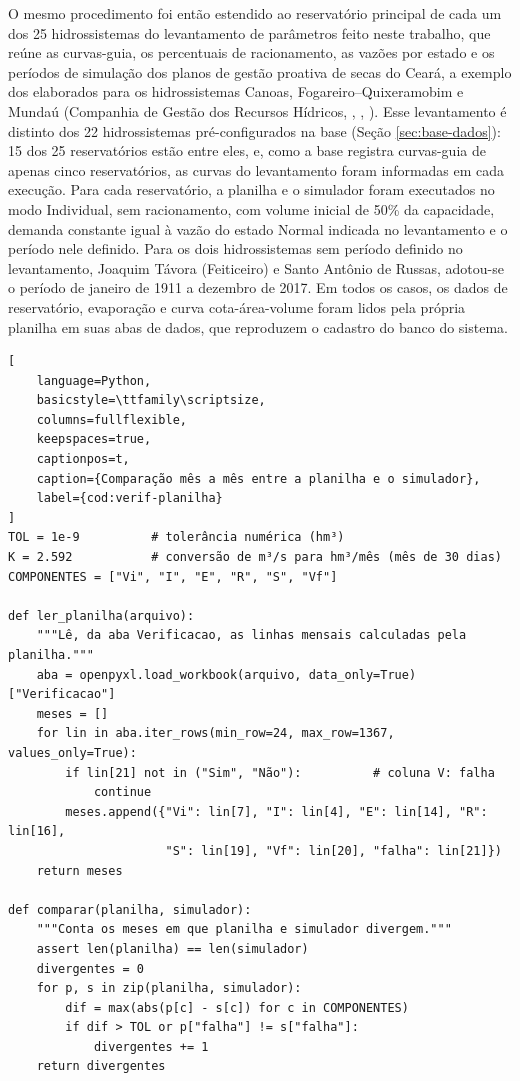 O mesmo procedimento foi então estendido ao reservatório principal de cada um dos 25 hidrossistemas do levantamento de parâmetros feito neste trabalho, que reúne as curvas-guia, os percentuais de racionamento, as vazões por estado e os períodos de simulação dos planos de gestão proativa de secas do Ceará, a exemplo dos elaborados para os hidrossistemas Canoas, Fogareiro--Quixeramobim e Mundaú (Companhia de Gestão dos Recursos Hídricos, \citeyear{pgpsFogareiroQuixeramobim2023}, \citeyear{pgpsCanoas2026}, \citeyear{pgpsMundau2026}). Esse levantamento é distinto dos 22 hidrossistemas pré-configurados na base (Seção \ref{sec:base-dados}): 15 dos 25 reservatórios estão entre eles, e, como a base registra curvas-guia de apenas cinco reservatórios, as curvas do levantamento foram informadas em cada execução. Para cada reservatório, a planilha e o simulador foram executados no modo Individual, sem racionamento, com volume inicial de 50\% da capacidade, demanda constante igual à vazão do estado Normal indicada no levantamento e o período nele definido. Para os dois hidrossistemas sem período definido no levantamento, Joaquim Távora (Feiticeiro) e Santo Antônio de Russas, adotou-se o período de janeiro de 1911 a dezembro de 2017. Em todos os casos, os dados de reservatório, evaporação e curva cota-área-volume foram lidos pela própria planilha em suas abas de dados, que reproduzem o cadastro do banco do sistema.

\noindent\begin{minipage}{\linewidth}
\begin{lstlisting}[
    language=Python,
    basicstyle=\ttfamily\scriptsize,
    columns=fullflexible,
    keepspaces=true,
    captionpos=t,
    caption={Comparação mês a mês entre a planilha e o simulador},
    label={cod:verif-planilha}
]
TOL = 1e-9          # tolerância numérica (hm³)
K = 2.592           # conversão de m³/s para hm³/mês (mês de 30 dias)
COMPONENTES = ["Vi", "I", "E", "R", "S", "Vf"]

def ler_planilha(arquivo):
    """Lê, da aba Verificacao, as linhas mensais calculadas pela planilha."""
    aba = openpyxl.load_workbook(arquivo, data_only=True)["Verificacao"]
    meses = []
    for lin in aba.iter_rows(min_row=24, max_row=1367, values_only=True):
        if lin[21] not in ("Sim", "Não"):          # coluna V: falha
            continue
        meses.append({"Vi": lin[7], "I": lin[4], "E": lin[14], "R": lin[16],
                      "S": lin[19], "Vf": lin[20], "falha": lin[21]})
    return meses

def comparar(planilha, simulador):
    """Conta os meses em que planilha e simulador divergem."""
    assert len(planilha) == len(simulador)
    divergentes = 0
    for p, s in zip(planilha, simulador):
        dif = max(abs(p[c] - s[c]) for c in COMPONENTES)
        if dif > TOL or p["falha"] != s["falha"]:
            divergentes += 1
    return divergentes
\end{lstlisting}
\end{minipage}
\par\medskip



